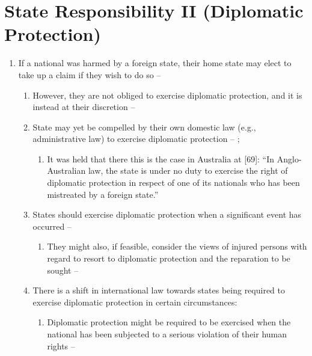 \section{State Responsibility II (Diplomatic Protection)} 
\begin{enumerate}
    \item If a national was harmed by a foreign state, their home state may elect to take up a claim if they wish to do so -- 
    \begin{enumerate}
        \item However, they are not obliged to exercise diplomatic protection, and it is instead at their discretion -- 
        \item State may yet be compelled by their own domestic law (e.g., administrative law) to exercise diplomatic protection -- ; 
        \begin{enumerate}
            \item It was held that there this is the case in Australia at [69]: ``In Anglo-Australian law, the state is under no duty to exercise the right of diplomatic protection in respect of one of its nationals who has been mistreated by a foreign state.''
        \end{enumerate}
        \item States should exercise diplomatic protection when a significant event has occurred -- 
        \begin{enumerate}
            \item They might also, if feasible, consider the views of injured persons with regard to resort to diplomatic protection and the reparation to be sought -- 
        \end{enumerate}
        \item There is a shift in international law towards states being required to exercise diplomatic protection in certain circumstances:
        \begin{enumerate}
            \item Diplomatic protection might be required to be exercised when the national has been subjected to a serious violation of their human rights -- 

\end{enumerate}
\end{enumerate}
\end{enumerate}

